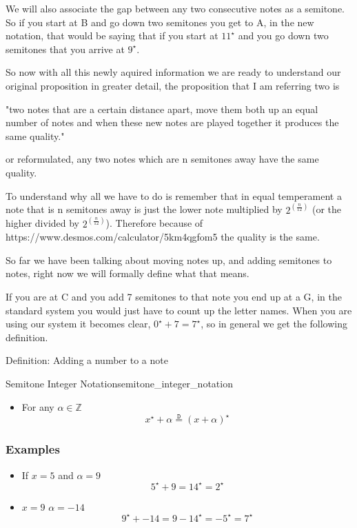 We will also associate the gap between any two consecutive notes as a semitone. So if you start at B and go down two semitones you get to A, in the new notation, that would be saying that if you start at $11^{\star}$ and you go down two semitones that you arrive at $9^{\star}$.

So now with all this newly aquired information we are ready to understand our original proposition in greater detail, the proposition that I am referring two is 

"two notes that are a certain distance apart, move them both up an equal number of notes and when these new notes are played together it produces the same quality."

or reformulated, any two notes which are n semitones away have the same quality.

To understand why all we have to do is remember that in equal temperament a note that is n semitones away is just the lower note multiplied by $2^(\frac{n}{12})$ (or the higher divided by $2^(\frac{n}{12})$). Therefore because of https://www.desmos.com/calculator/5km4qgfom5 the quality is the same.

So far we have been talking about moving notes up, and adding semitones to notes, right now we will formally define what that means.

If you are at C and you add 7 semitones to that note you end up at a G, in the standard system you would just have to count up the letter names. When you are using our system it becomes clear, $0^{\star} + 7 = 7^{\star}$, so in general we get the following definition.

Definition: Adding a number to a note

\begin{definition}{Semitone Integer Notation}{semitone_integer_notation}
  \begin{itemize}
    \item For any $\alpha \in \mathbb{Z}$
      \[
        x^{\star}  +  \alpha \stackrel{\mathtt{D}}{=} \left( x  +  \alpha \right)^{\star}
      \]
  \end{itemize}
  \subsubsection*{Examples}
  \begin{itemize}
    \item If $x = 5$ and $\alpha = 9$
      \[
        5^{\star}  +  9 = 14^{\star} = 2^{\star}
      \] 
    \item $x = 9$ $\alpha = -14$ 
      \[
        9^{\star}  +   - 14 = 9  -  14^{\star} =   - 5^{\star} = 7^{\star}
      \]
  \end{itemize}
\end{definition}

